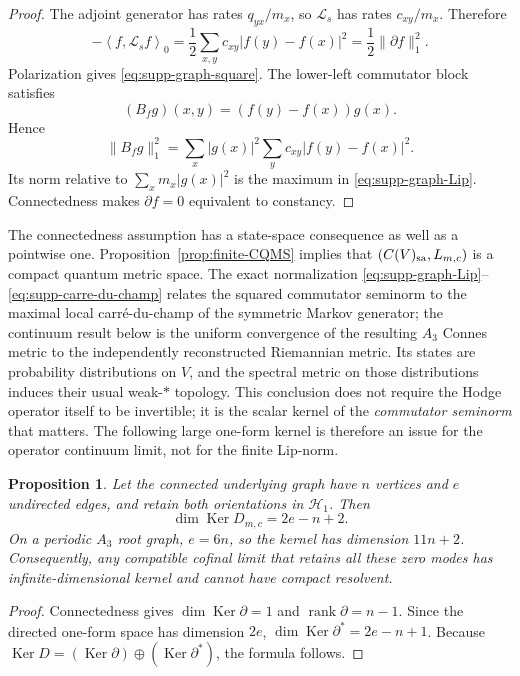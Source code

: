 \documentclass[11pt]{article}
\newtheorem{proposition}[proposition]{Proposition}
\theoremstyle{definition}
\theoremstyle{remark}
\theoremstyle{definition}
\theoremstyle{remark}
\newcommand{\rank}{\operatorname{rank}}
\newcommand{\Ker}{\operatorname{Ker}}
\newcommand{\norm}[1]{\lVert#1\rVert}
\newcommand{\ip}[2]{\left\langle #1,#2\right\rangle}
\newcommand{\Hh}{\mathcal H}
\begin{document}
\begin{proof}
The adjoint generator has rates $q_{yx}/m_x$, so $\mathcal L_s$ has rates
$c_{xy}/m_x$.  Therefore
\[
 -\ip{f}{\mathcal L_sf}_0
 =\frac12\sum_{x,y}c_{xy}|f(y)-f(x)|^2
 =\frac12\norm{\partial f}_1^2.
\]
Polarization gives \eqref{eq:supp-graph-square}.  The lower-left commutator
block satisfies
\[
 (B_fg)(x,y)=(f(y)-f(x))g(x).
\]
Hence
\[
 \norm{B_fg}_1^2
 =\sum_x|g(x)|^2\sum_yc_{xy}|f(y)-f(x)|^2.
\]
Its norm relative to $\sum_xm_x|g(x)|^2$ is the maximum in
\eqref{eq:supp-graph-Lip}.  Connectedness makes $\partial f=0$ equivalent to
constancy.
\end{proof}

The connectedness assumption has a state-space consequence as well as a
pointwise one.  Proposition~\ref{prop:finite-CQMS} implies that
$(C(V)_{\rm sa},L_{m,c})$ is a compact quantum metric space.  The exact normalization
\eqref{eq:supp-graph-Lip}--\eqref{eq:supp-carre-du-champ} relates the squared
commutator seminorm to the maximal local carr\'e-du-champ of the symmetric Markov
generator; the continuum result below is
the uniform convergence of the resulting $A_3$ Connes metric to the independently
reconstructed Riemannian metric.  Its states are
probability distributions on $V$, and the spectral metric on those distributions
induces their usual weak-$*$ topology.  This conclusion does not require the
Hodge operator itself to be invertible; it is the scalar kernel of the
\emph{commutator seminorm} that matters.  The following large one-form kernel is
therefore an issue for the operator continuum limit, not for the finite Lip-norm.

\begin{proposition}
\label{cth:supp-extensive-kernel}
Let the connected underlying graph have $n$ vertices and $e$ undirected edges,
and retain both orientations in $\Hh_1$.  Then
\begin{equation}
 {\dim\Ker D_{m,c}=2e-n+2.}
 \label{eq:supp-extensive-kernel}
\end{equation}
On a periodic $A_3$ root graph, $e=6n$, so the kernel has dimension $11n+2$.
Consequently, any compatible cofinal limit that retains all these zero modes
has infinite-dimensional kernel and cannot have compact resolvent.
\end{proposition}

\begin{proof}
Connectedness gives $\dim\Ker\partial=1$ and $\rank\partial=n-1$.  Since the
directed one-form space has dimension $2e$,
$\dim\Ker\partial^*=2e-n+1$.  Because
$\Ker D=(\Ker\partial)\oplus(\Ker\partial^*)$, the formula follows.
\end{proof}
\end{document}
